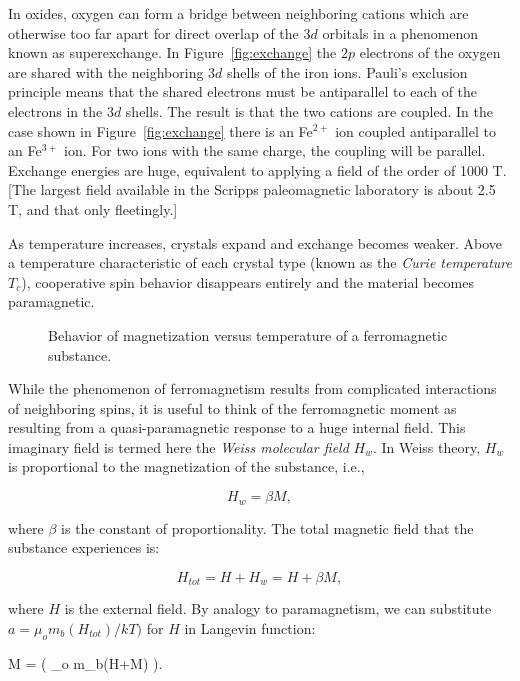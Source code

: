 In oxides, oxygen can form a bridge between neighboring cations which are otherwise too far apart for direct overlap of the $3d$ orbitals in a phenomenon known as superexchange.  In Figure~\ref{fig:exchange} the $2p$ electrons of the oxygen are shared with the neighboring $3d$ shells of the iron ions.  Pauli's exclusion principle means that the shared electrons must be antiparallel to each of  the electrons in the $3d$ shells.  The result is that the two cations are coupled.  In the case shown in Figure~\ref{fig:exchange} there is an Fe$^{2+}$ ion coupled antiparallel to an Fe$^{3+}$ ion.  For two ions with the same charge, the coupling will be parallel.  Exchange energies are huge, equivalent to applying a field of the order of 1000 T.  [The largest field available in the Scripps paleomagnetic laboratory is about 2.5 T, and that only fleetingly.]
 
As temperature increases,  crystals expand and exchange  becomes weaker.
 Above a temperature characteristic of
 each crystal type (known as the
  {\it Curie temperature}
 $T_c$), cooperative spin  behavior disappears entirely and the material becomes 
paramagnetic.  

 
\begin{figure}[htb]
\epsfxsize 12cm
\centering {}
\caption{Behavior of magnetization versus temperature of a ferromagnetic
substance.   }
\label{fig:MsT}
\end{figure}


While the phenomenon of ferromagnetism results from complicated
interactions of neighboring spins, it is useful to think of the
ferromagnetic moment as resulting from a quasi-paramagnetic response to
a huge internal field.  This imaginary field is termed here the {\it Weiss molecular field} $H_w$.  In 
%
Weiss theory, $H_w$ is proportional to the
magnetization of the substance, i.e., 

$$
H_w = \beta M,
$$

\noindent
where $\beta$ is the constant of proportionality.
The total magnetic field that the substance experiences is:

$$
H_{tot} = H + H_w = H + \beta M,
$$

\noindent where $H$ is the external field.  By analogy to paramagnetism,
we can substitute $a=\mu_om_b(H_{tot})/kT)$ for $H$ in
 Langevin function:

\beq
{M  } {=  \left({ {\mu_o m_b(H+\beta M)} } \right)}.
\label{eq:Mweiss}
\eeq

